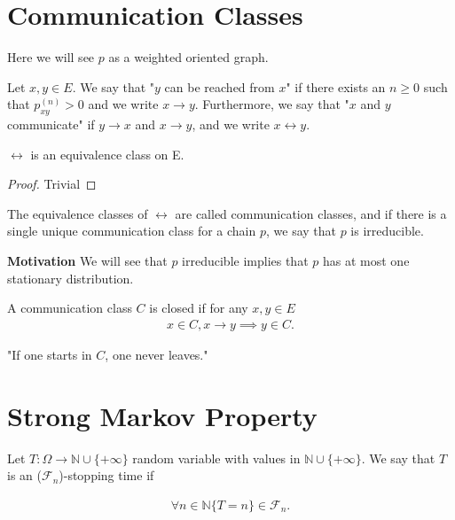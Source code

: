 \section{Communication Classes}
Here we will see $p$ as a weighted oriented graph.
\begin{defn}
	Let $x,y \in E$. We say that "$y$ can be reached from $ x$" if there exists an $n \geq 0$ such that  $p_{xy}^{(n)}>0$ and we write $x \to y$. Furthermore, we say that "$x$ and $y $ communicate"  if $y  \rightarrow x$ and $x  \rightarrow y$, and  we write $x  \leftrightarrow y$.
\end{defn}

\begin{prop}[]
	$\leftrightarrow$ is an equivalence class on E.
\end{prop}
\begin{proof}
Trivial\end{proof}


\begin{defn}
	The equivalence classes of $ \leftrightarrow $ are called communication classes, and if there is a single unique communication class for a chain $p$, we say that $p$ is irreducible.
\end{defn}

\noindent
\textbf{Motivation} We will see that $p$ irreducible implies that $p$ has at most one stationary distribution.

\begin{defn}
	A communication class $C$ is closed if for any $x,y \in E$
\begin{align}
 x \in C, x \to y \implies y \in C.
\end{align}
\end{defn}
"If one starts in $C$, one never leaves."

\section{Strong Markov Property}
	
\begin{defn}
	Let $T:\Omega \to \mathbb{N} \cup \{+\infty\}$ random variable with values in $\mathbb{N}\cup\{+\infty\}$. We say that $T$ is an ($ \mathcal{F}_n$)-stopping time if
	
	\begin{align}
		\forall n \in \mathbb{N} \{T=n\} \in \mathcal{F}_n
	.\end{align}
\end{defn}

